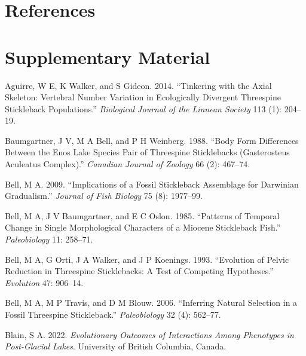 \documentclass[
  12pt,
]{article}
\newlength{\cslhangindent}
\newlength{\cslentryspacingunit} %
\newenvironment{CSLReferences}[2] %
 {%
  \setlength{\parindent}{0pt}
  \ifodd #1
  \let\oldpar\par
  \def\par{\hangindent=\cslhangindent\oldpar}
  \fi
  \setlength{\parskip}{#2\cslentryspacingunit}
 }%
 {}
\begin{document}
\hypertarget{sec:references}{%
\section{References}\label{sec:references}}

\hypertarget{sec:supplementary}{%
\section{Supplementary Material}\label{sec:supplementary}}

\hypertarget{refs}{}
\begin{CSLReferences}{1}{0}
\leavevmode{}%
Aguirre, W E, K Walker, and S Gideon. 2014. {``Tinkering with the Axial
Skeleton: Vertebral Number Variation in Ecologically Divergent
Threespine Stickleback Populations.''} \emph{Biological Journal of the
Linnean Society} 113 (1): 204--19.

\leavevmode{}%
Baumgartner, J V, M A Bell, and P H Weinberg. 1988. {``Body Form
Differences Between the Enos Lake Species Pair of Threespine
Sticklebacks (Gasterosteus Aculeatus Complex).''} \emph{Canadian Journal
of Zoology} 66 (2): 467--74.

\leavevmode{}%
Bell, M A. 2009. {``Implications of a Fossil Stickleback Assemblage for
Darwinian Gradualism.''} \emph{Journal of Fish Biology} 75 (8):
1977--99.

\leavevmode{}%
Bell, M A, J V Baumgartner, and E C Oslon. 1985. {``Patterns of Temporal
Change in Single Morphological Characters of a Miocene Stickleback
Fish.''} \emph{Paleobiology} 11: 258--71.

\leavevmode{}%
Bell, M A, G Orti, J A Walker, and J P Koenings. 1993. {``Evolution of
Pelvic Reduction in Threespine Sticklebacks: A Test of Competing
Hypotheses.''} \emph{Evolution} 47: 906--14.

\leavevmode{}%
Bell, M A, M P Travis, and D M Blouw. 2006. {``Inferring Natural
Selection in a Fossil Threespine Stickleback.''} \emph{Paleobiology} 32
(4): 562--77.

\leavevmode{}%
Blain, S A. 2022. \emph{Evolutionary Outcomes of Interactions Among
Phenotypes in Post-Glacial Lakes}. University of British Columbia,
Canada.


\end{CSLReferences}
\end{document}
